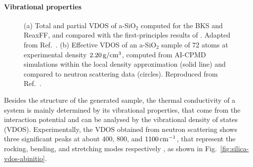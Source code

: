 \paragraph{Vibrational properties}
\begin{figure}[!tb]
    \centering
    \caption{
    (a) Total and partial VDOS of a-SiO$_2$ computed for the BKS and ReaxFF, and compared with the first-principles results of \textcite{Bhattarai2016}. Adapted from Ref.~\cite{Tian2017}.
    (b) Effective VDOS of an a-SiO$_2$ sample of $72$ atoms at experimental density $2.20\,\mathrm{g/cm^3}$, computed from AI-CPMD simulations within the local density approximation (solid line) and compared to neutron scattering data (circles). Reproduced from Ref.~\cite{Sarnthein1997}.}
\end{figure}

Besides the structure of the generated sample, the thermal conductivity of a system is mainly determined by its vibrational properties, that come from the interaction potential and can be analysed by the vibrational density of states (VDOS).
Experimentally, the VDOS obtained from neutron scattering shows three significant peaks at about $400$, $800$, and $1100\,\mathrm{cm^{-1}}$, that represent the rocking, bending, and stretching modes respectively \cite{Galeener1983}, as shown in Fig.~\ref{fig:silica-vdos-abinitio}.


